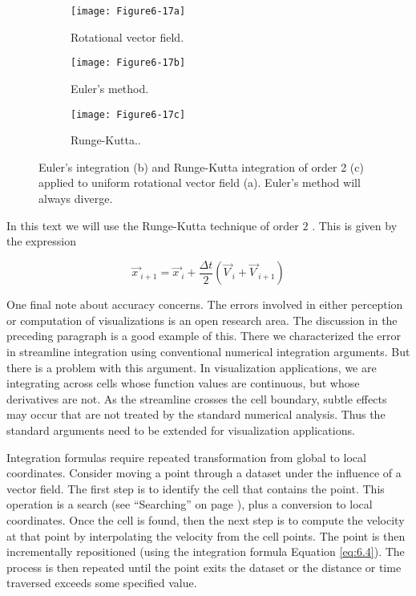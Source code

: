 \begin{figure}[htb]
	\begin{subfigure}[h]{0.32\linewidth}
		\texttt{[image: Figure6-17a]}
		\caption{Rotational vector field.}\label{fig:Figure6-17a}
	\end{subfigure}
	\hfill
	\begin{subfigure}[h]{0.32\linewidth}
	\texttt{[image: Figure6-17b]}
	\caption{Euler’s method.}\label{fig:Figure6-17b}
	\end{subfigure}
	\hfill
	\begin{subfigure}[h]{0.32\linewidth}
	\texttt{[image: Figure6-17c]}
	\caption{Runge-Kutta..}\label{fig:Figure6-17c}
\end{subfigure}
	\caption{Euler’s integration (b) and Runge-Kutta integration of order 2 (c) applied to uniform rotational vector field (a). Euler’s method will always diverge.}\label{fig:Figure6-17}
\end{figure}

In this text we will use the Runge-Kutta technique of order $2$ \cite{Conte72}. This is given by the expression

\begin{equation}\label{eq:6.4}
\overrightarrow{x\ }_{i+1} = \overrightarrow{x\ }_i +\frac{\Delta t}{2}(\overrightarrow{V\ }_i + \overrightarrow{V\ }_{i+1})
\end{equation}

One final note about accuracy concerns. The errors involved in either perception or computation of visualizations is an open research area. The discussion in the preceding paragraph is a good example of this. There we characterized the error in streamline integration using conventional numerical integration arguments. But there is a problem with this argument. In visualization applications, we are integrating across cells whose function values are continuous, but whose derivatives are not. As the streamline crosses the cell boundary, subtle effects may occur that are not treated by the standard numerical analysis. Thus the standard arguments need to be extended for visualization applications.

Integration formulas require repeated transformation from global to local coordinates. Consider moving a point through a dataset under the influence of a vector field. The first step is to identify the cell that contains the point. This operation is a search (see ``Searching'' on page \pageref{sec:searching} ), plus a conversion to local coordinates. Once the cell is found, then the next step is to compute the velocity at that point by interpolating the velocity from the cell points. The point is then incrementally repositioned (using the integration formula Equation \ref{eq:6.4}).
The process is then repeated until the point exits the dataset or the distance or time traversed exceeds some specified value.

